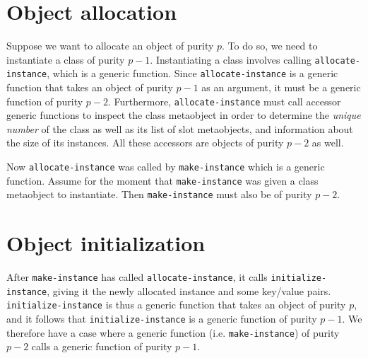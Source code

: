 \section{Object allocation}

Suppose we want to allocate an object of purity $p$.  To do so, we
need to instantiate a class of purity $p-1$.  Instantiating a class
involves calling \texttt{allocate-instance}, which is a generic
function.  Since \texttt{allocate-instance} is a generic function that
takes an object of purity $p-1$ as an argument, it must be a generic
function of purity $p-2$.  Furthermore, \texttt{allocate-instance}
must call accessor generic functions to inspect the class metaobject
in order to determine the \emph{unique number} of the class as well as
its list of slot metaobjects, and information about the size of its
instances.  All these accessors are objects of purity $p-2$ as well.

Now \texttt{allocate-instance} was called by \texttt{make-instance}
which is a generic function.  Assume for the moment that
\texttt{make-instance} was given a class metaobject to instantiate.
Then \texttt{make-instance} must also be of purity $p-2$.

\section{Object initialization}

After \texttt{make-instance} has called \texttt{allocate-instance}, it
calls \texttt{initialize-instance}, giving it the newly allocated
instance and some key/value pairs.  \texttt{initialize-instance} is
thus a generic function that takes an object of purity $p$, and it
follows that \texttt{initialize-instance} is a generic function of
purity $p-1$.  We therefore have a case where a generic function
(i.e. \texttt{make-instance}) of purity $p-2$ calls a generic function
of purity $p-1$.
